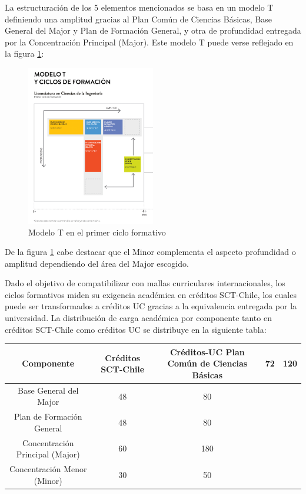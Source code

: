 La estructuración de los 5 elementos mencionados se basa en un modelo T definiendo una amplitud gracias al Plan Común de Ciencias Básicas, Base General del Major y Plan de Formación General, y otra de profundidad entregada por la Concentración Principal (Major). Este modelo T puede verse reflejado en la figura \ref{fig:t_model}:

\begin{figure}[ht]
	\begin{center}
  \includegraphics[width=0.5\textwidth]{./figures/model_t.png}
  \caption{Modelo T en el primer ciclo formativo}
  \label{fig:t_model}
	\end{center}
\end{figure}

De la figura \ref{fig:t_model} cabe destacar que el Minor complementa el aspecto profundidad o amplitud dependiendo del área del Major escogido.

Dado el objetivo de compatibilizar con mallas curriculares internacionales, los ciclos formativos miden su exigencia académica en créditos SCT-Chile, los cuales puede ser transformados a créditos UC gracias a la equivalencia entregada por la universidad. La distribución de carga académica por componente tanto en créditos SCT-Chile como créditos UC se distribuye en la siguiente tabla:

\begin{tabularx}{\linewidth}{@{}c c c@{}}
  \caption{Distribución de créditos SCT-Chile y UC en el primer ciclo formativo} \label{tab:distrution_credits}\\
  \toprule
  Componente & Créditos SCT-Chile & Créditos-UC
  \endhead
  \midrule
  Plan Común de Ciencias Básicas & 72 & 120\\
  \midrule
  Base General del Major & 48 & 80\\
  \midrule
  Plan de Formación General & 48 & 80\\
  \midrule
  Concentración Principal (Major) & 60 & 180\\
  \midrule
  Concentración Menor (Minor) & 30 & 50\\
  \bottomrule
\end{tabularx}


